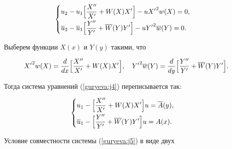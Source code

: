 \begin{equation}


\label{guryeva:j4}


\begin{cases}


\displaystyle u_{2}-u_{1} \Bigl[ \frac{ X'' }{{X' }}+W(X){X' }\Bigr]-u {X '} ^2w(X)=0, \vspace{1mm}


\\


\displaystyle \overline{u}_{2}-\overline{u}_{1}\Bigl[


\frac{Y''}{Y'}+\overline{W}(Y)Y' \Bigr]-u {Y '}^2 \overline{w}(Y)=0.


\end{cases}


\end{equation}





Выберем функции $X(x)$  и $Y(y)$ такими, что


$$


{X' }^2 w(X)=


\frac{d}{dx}\Bigl[ \frac{X'' }{X' }+W(X){X'}\Bigr], \quad


\displaystyle {Y' }^2 \overline{w}(Y)=


\frac{d}{dy}\Bigl[ \frac{Y''}{Y' }+\overline{W}(Y)Y'\Bigr].


$$


Тогда система уравнений (\ref{guryeva:j4}) переписывается так:


\begin{equation} \label{guryeva:j5}


\begin{cases}


\displaystyle u_{1}-\Bigl[ \frac{X''}{X'}+W(X){X' }\Bigr] u = \overline{A}(y),  \vspace{1mm}


\\


\displaystyle\overline{u}_{1}-\Bigl[ \frac{Y''}{Y' }+\overline{W}(Y)Y'\Bigr]u = A(x).


\end{cases}


\end{equation}





Условие совместности системы (\ref{guryeva:j5}) в виде двух


